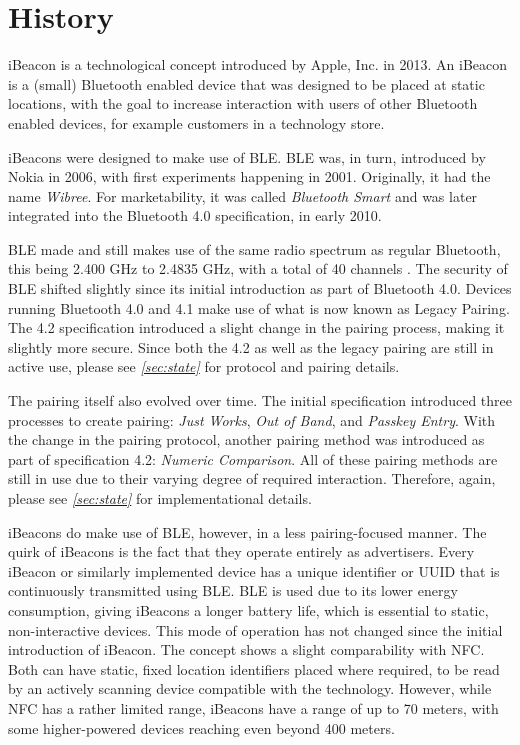 \section{History}
\label{sec:history}

iBeacon is a technological concept introduced by Apple, Inc. in 2013. An iBeacon is a (small) Bluetooth enabled device that was designed to be placed at static locations, with the goal to increase interaction with users of other Bluetooth enabled devices, for example customers in a technology store.

iBeacons were designed to make use of \ac{BLE}. \ac{BLE} was, in turn, introduced by Nokia in 2006, with first experiments happening in 2001. Originally, it had the name \textit{Wibree}. For marketability, it was called \textit{Bluetooth Smart} and was later integrated into the Bluetooth 4.0 specification, in early 2010.

\ac{BLE} made and still makes use of the same radio spectrum as regular Bluetooth, this being 2.400 GHz to 2.4835 GHz, with a total of 40 channels \cite{wiki}. The security of \ac{BLE} shifted slightly since its initial introduction as part of Bluetooth 4.0. Devices running Bluetooth 4.0 and 4.1 make use of what is now known as Legacy Pairing. The 4.2 specification introduced a slight change in the pairing process, making it slightly more secure. Since both the 4.2 as well as the legacy pairing are still in active use, please see \textit{\ref{sec:state} } for protocol and pairing details.

The pairing itself also evolved over time. The initial specification introduced three processes to create pairing: \textit{Just Works}, \textit{Out of Band}, and \textit{Passkey Entry}. With the change in the pairing protocol, another pairing method was introduced as part of specification 4.2: \textit{Numeric Comparison}. All of these pairing methods are still in use due to their varying degree of required interaction. Therefore, again, please see \textit{\ref{sec:state} } for implementational details.

iBeacons do make use of \ac{BLE}, however, in a less pairing-focused manner. The quirk of iBeacons is the fact that they operate entirely as advertisers. Every iBeacon or similarly implemented device has a unique identifier or UUID that is continuously transmitted using \ac{BLE}. \ac{BLE} is used due to its lower energy consumption, giving iBeacons a longer battery life, which is essential to static, non-interactive devices. This mode of operation has not changed since the initial introduction of iBeacon. The concept shows a slight comparability with \ac{NFC}. Both can have static, fixed location identifiers placed where required, to be read by an actively scanning device compatible with the technology. However, while \ac{NFC} has a rather limited range, iBeacons have a range of up to 70 meters, with some higher-powered devices reaching even beyond 400 meters.